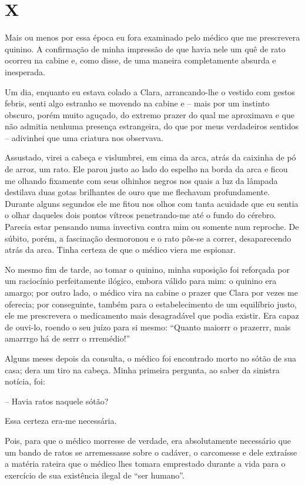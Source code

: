 \chapter*{\centering\Large{X}}

Mais ou menos por essa época eu fora examinado pelo médico que me prescrevera quinino. A confirmação de minha impressão de que havia nele um quê de rato ocorreu na cabine e, como disse, de uma maneira completamente absurda e inesperada. 

Um dia, enquanto eu estava colado a Clara, arrancando-lhe o vestido com gestos febris, senti algo estranho se movendo na cabine e -- mais por um instinto obscuro, porém muito aguçado, do extremo prazer do qual me aproximava e que não admitia nenhuma presença estrangeira, do que por meus verdadeiros sentidos -- adivinhei que uma criatura nos observava.

Assustado, virei a cabeça e vislumbrei, em cima da arca, atrás da caixinha de pó de arroz, um rato. Ele parou justo ao lado do espelho na borda da arca e ficou me olhando fixamente com seus olhinhos negros nos quais a luz da lâmpada destilava duas gotas brilhantes de ouro que me flechavam profundamente. Durante alguns segundos ele me fitou nos olhos com tanta acuidade que eu sentia o olhar daqueles dois pontos vítreos penetrando-me até o fundo do cérebro. Parecia estar pensando numa invectiva contra mim ou somente num reproche. De súbito, porém, a fascinação desmoronou e o rato pôs-se a correr, desaparecendo atrás da arca. Tinha certeza de que o médico viera me espionar.

No mesmo fim de tarde, ao tomar o quinino, minha suposição foi reforçada por um raciocínio perfeitamente ilógico, embora válido para mim: o quinino era amargo; por outro lado, o médico vira na cabine o prazer que Clara por vezes me oferecia; por conseguinte, também para o estabelecimento de um equilíbrio justo, ele me prescrevera o medicamento mais desagradável que podia existir. Era capaz de ouvi-lo, roendo o seu juízo para si mesmo: ``Quanto maiorrr o prazerrr, mais amarrrgo há de serrr o rrremédio!''

Alguns meses depois da consulta, o médico foi encontrado morto no sótão de sua casa; dera um tiro na cabeça.
Minha primeira pergunta, ao saber da sinistra notícia, foi:

-- Havia ratos naquele sótão?

Essa certeza era-me necessária.

Pois, para que o médico morresse de verdade, era absolutamente necessário que um bando de ratos se arremessasse sobre o cadáver, o carcomesse e dele extraísse a matéria rateira que o médico lhes tomara emprestado durante a vida para o exercício de sua existência ilegal de ``ser humano''.


